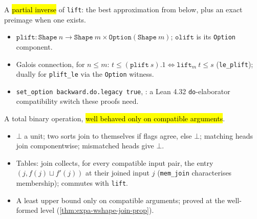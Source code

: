 \begin{definition}
\label{def:expa-shape-plift}
\leanok
{}
 A \hl{partial inverse} of \texttt{lift}: the best approximation from below, plus an
exact preimage when one exists.
\begin{itemize}
\item $\mathtt{plift} : \mathtt{Shape}\ n \to \mathtt{Shape}\ m \times \mathtt{Option}(\mathtt{Shape}\
m)$; $\mathtt{olift}$ is its \texttt{Option} component.
\item Galois connection, for $n\le m$: $t \le (\mathtt{plift}\ s).1 \iff \mathtt{lift}_m\ t \le s$
(\texttt{le\_plift}); dually for \texttt{plift\_le} via the \texttt{Option} witness.
\item \texttt{set\_option backward.do.legacy true}, :
a Lean 4.32 \texttt{do}-elaborator compatibility switch these proofs need.
\end{itemize}
\end{definition}

\begin{definition}
\label{def:expa-shape-join}
\leanok
{}
 A total binary operation, \hl{well behaved only on compatible arguments}.
\begin{itemize}
\item $\bot$ a unit; two sorts join to themselves if flags agree, else $\bot$; matching heads join
componentwise; mismatched heads give $\bot$.
\item Tables: join collects, for every compatible input pair, the entry $(j, f(j)\sqcup f'(j))$ at
their joined input $j$ (\texttt{mem\_join} characterises membership); commutes with \texttt{lift}.
\item A least upper bound only on compatible arguments; proved at the well-formed level
(\ref{thm:expa-wshape-join-prop}).
\end{itemize}
\end{definition}

